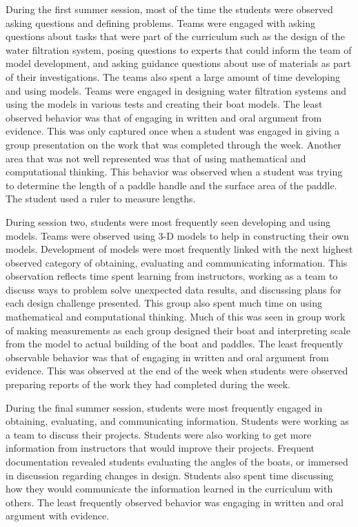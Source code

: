 \documentclass[11.5pt]{sig-alternate} %
\begin{document}
\begin{large}
During the first summer session, most of the time the students were observed asking questions and defining problems. Teams were engaged with asking questions about tasks that were part of the curriculum such as the design of the water filtration system, posing questions to experts that could inform the team of model development, and asking guidance questions about use of materials as part of their investigations. The teams also spent a large amount of time developing and using models. Teams were engaged in designing water filtration systems and using the models in various tests and creating their boat models. The least observed behavior was that of engaging in written and oral argument from evidence. This was only captured once when a student was engaged in giving a group presentation on the work that was completed through the week. Another area that was not well represented was that of using mathematical and computational thinking. This behavior was observed when a student was trying to determine the length of a paddle handle and the surface area of the paddle. The student used a ruler to measure lengths.   

During session two, students were most frequently seen developing and using models. Teams were observed using 3-D models to help in constructing their own models. Development of models were most frequently linked with the next highest observed category of obtaining, evaluating and communicating information. This observation reflects time spent learning from instructors, working as a team to discuss ways to problem solve unexpected data results, and discussing plans for each design challenge presented. This group also spent much time on using mathematical and computational thinking. Much of this was seen in group work of making measurements as each group designed their boat and interpreting scale from the model to actual building of the boat and paddles. The least frequently observable behavior was that of engaging in written and oral argument from evidence. This was observed at the end of the week when students were observed preparing reports of the work they had completed during the week.  

During the final summer session, students were most frequently engaged in obtaining, evaluating, and communicating information. Students were working as a team to discuss their projects. Students were also working to get more information from instructors that would improve their projects. Frequent documentation revealed students evaluating the angles of the boats, or immersed in discussion regarding changes in design. Students also spent time discussing how they would communicate the information learned in the curriculum with others. The least frequently observed behavior was engaging in written and oral argument with evidence.  


\end{large}
\end{document}
